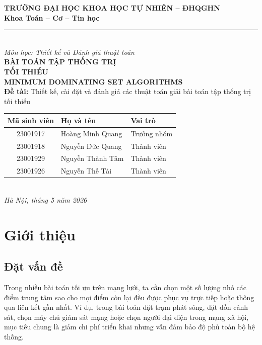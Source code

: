 \documentclass[12pt, a4paper]{report}
\begin{document}

\begin{titlepage}
  \centering
  \textbf{\large TRƯỜNG ĐẠI HỌC KHOA HỌC TỰ NHIÊN -- ĐHQGHN}\\[0.3cm]
  \textbf{\large Khoa Toán -- Cơ -- Tin học}\\[0.5cm]
  \rule{\linewidth}{0.5pt}\\[1cm]

  {\large\textit{Môn học: Thiết kế và Đánh giá thuật toán}}\\[2cm]

  {\Huge\bfseries\color{primaryblue} BÀI TOÁN TẬP THỐNG TRỊ\\[0.3cm] TỐI THIỂU}\\[0.5cm]
  {\Large\textbf{MINIMUM DOMINATING SET ALGORITHMS}}\\[2cm]

  \textbf{Đề tài:} Thiết kế, cài đặt và đánh giá các thuật toán giải bài toán tập thống trị tối thiểu\\[1cm]

  \begin{tabular}{|c|l|l|}
    \hline
    \textbf{Mã sinh viên} & \textbf{Họ và tên} & \textbf{Vai trò} \\
    \hline
    23001917 & Hoàng Minh Quang & Trưởng nhóm \\
    23001918 & Nguyễn Đức Quang & Thành viên \\
    23001929 & Nguyễn Thành Tâm & Thành viên \\
    23001926 & Nguyễn Thế Tài & Thành viên \\
    \hline
  \end{tabular}\\[2cm]

  \textit{Hà Nội, tháng 5 năm 2026}
\end{titlepage}

\tableofcontents
\listoffigures
\listoftables
\newpage

\chapter{Giới thiệu}

\section{Đặt vấn đề}

Trong nhiều bài toán tối ưu trên mạng lưới, ta cần chọn một số lượng nhỏ các điểm trung tâm sao cho
mọi điểm còn lại đều được phục vụ trực tiếp hoặc thông qua liên kết gần nhất. Ví dụ, trong bài toán đặt
trạm phát sóng, đặt đồn cảnh sát, chọn máy chủ giám sát mạng hoặc chọn người đại diện trong mạng xã
hội, mục tiêu chung là giảm chi phí triển khai nhưng vẫn đảm bảo độ phủ toàn bộ hệ thống.
\end{document}
